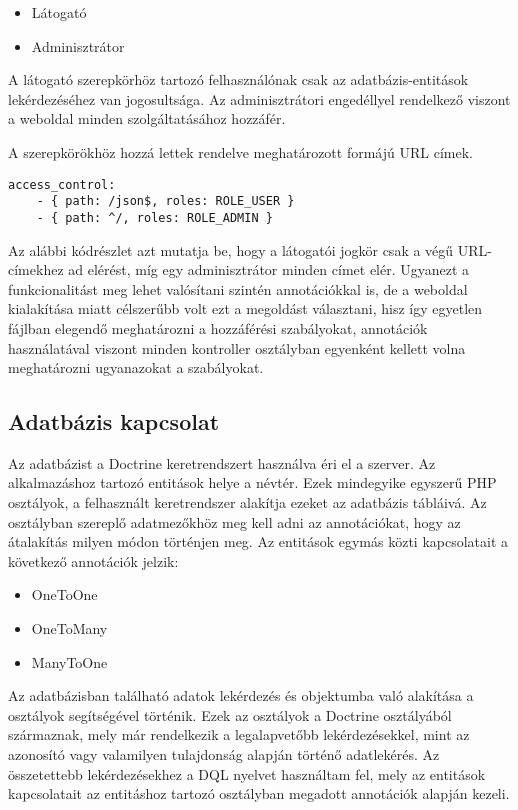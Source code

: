 \begin{itemize}
	\item Látogató
	\item Adminisztrátor
\end{itemize}

A látogató szerepkörhöz tartozó felhasználónak csak az adatbázis-entitások lekérdezéséhez van jogosultsága. 
Az adminisztrátori engedéllyel rendelkező viszont a weboldal minden szolgáltatásához hozzáfér. 

A szerepkörökhöz hozzá lettek rendelve meghatározott formájú URL címek. 

\begin{lstlisting}
access_control:
    - { path: /json$, roles: ROLE_USER }
    - { path: ^/, roles: ROLE_ADMIN }
\end{lstlisting}

Az alábbi kódrészlet azt mutatja be, hogy a látogatói jogkör csak a  végű URL-címekhez ad elérést, míg egy adminisztrátor minden címet elér. 
Ugyanezt a funkcionalitást meg lehet valósítani szintén annotációkkal is, de a weboldal kialakítása miatt célszerűbb volt ezt a megoldást választani, hisz így egyetlen fájlban elegendő meghatározni a hozzáférési szabályokat, annotációk használatával viszont minden kontroller osztályban egyenként kellett volna meghatározni ugyanazokat a szabályokat.

\subsection*{Adatbázis kapcsolat}
\label{adatbazis}

Az adatbázist a Doctrine keretrendszert használva éri el a szerver. 
Az alkalmazáshoz tartozó entitások helye a  névtér. 
Ezek mindegyike egyszerű PHP osztályok, a felhasznált keretrendszer alakítja ezeket az adatbázis tábláivá. 
Az osztályban szereplő adatmezőkhöz meg kell adni az annotációkat, hogy az átalakítás milyen módon történjen meg. 
Az entitások egymás közti kapcsolatait a következő annotációk jelzik:

\begin{itemize}
	\item OneToOne
	\item OneToMany
	\item ManyToOne
\end{itemize}

Az adatbázisban található adatok lekérdezés és objektumba való alakítása a  osztályok segítségével történik. 
Ezek az osztályok a Doctrine  osztályából származnak, mely már rendelkezik a legalapvetőbb lekérdezésekkel, mint az azonosító vagy valamilyen tulajdonság alapján történő adatlekérés. 
Az összetettebb lekérdezésekhez a DQL nyelvet használtam fel, mely az entitások kapcsolatait az entitáshoz tartozó osztályban megadott annotációk alapján kezeli. 

